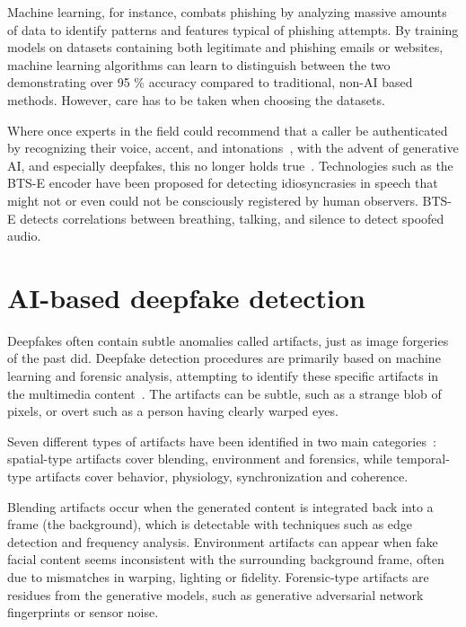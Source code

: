 Machine learning, for instance, combats phishing by analyzing massive amounts of data to identify patterns and features typical of phishing attempts. By training models on datasets containing both legitimate and phishing emails or websites, machine learning algorithms can learn to distinguish between the two demonstrating over 95 \% accuracy compared to traditional, non-AI based methods. However, care has to be taken when choosing the datasets.


Where once experts in the field could recommend that a caller be authenticated by recognizing their voice, accent, and intonations~\citep{mitnick_The_Art_of_Deception_2003}, with the advent of generative AI, and especially deepfakes, this no longer holds true~\citep{doan_BTSE_Audio_Deepfake_Detection_2023}. Technologies such as the BTS-E encoder have been proposed for detecting idiosyncrasies in speech that might not or even could not be consciously registered by human observers. BTS-E detects correlations between breathing, talking, and silence to detect spoofed audio.

\section{AI-based deepfake detection}
\begin{comment}
  -
\end{comment}

Deepfakes often contain subtle anomalies called artifacts, just as image forgeries of the past did. Deepfake detection procedures are primarily based on machine learning and forensic analysis, attempting to identify these specific artifacts in the multimedia content~\citep{mirsky_Creation_Detection_Deepfakes_2021}. The artifacts can be subtle, such as a strange blob of pixels, or overt such as a person having clearly warped eyes.

Seven different types of artifacts have been identified in two main categories~\citep{mirsky_Creation_Detection_Deepfakes_2021}: spatial-type artifacts cover blending, environment and forensics, while temporal-type artifacts cover behavior, physiology, synchronization and coherence.

Blending artifacts occur when the generated content is integrated back into a frame (the background), which is detectable with techniques such as edge detection and frequency analysis. Environment artifacts can appear when fake facial content seems inconsistent with the surrounding background frame, often due to mismatches in warping, lighting or fidelity. Forensic-type artifacts are residues from the generative models, such as generative adversarial network fingerprints or sensor noise.

